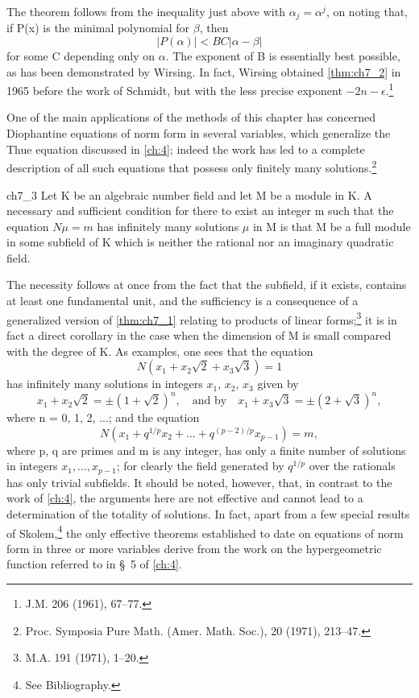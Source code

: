 The theorem follows from the inequality just above with  $\alpha_j = \alpha^j$, on noting that, if P(x) is the minimal polynomial for  $\beta$, then
\[|P(\alpha)| < BC|\alpha - \beta|\]
for some C depending only on  $\alpha$. The exponent of B is essentially best possible, as has been demonstrated by Wirsing. In fact, Wirsing obtained \autoref{thm:ch7_2} in 1965 before the work of Schmidt, but with the less precise exponent  $-2n - \epsilon$.\footnote{J.M. 206 (1961), 67--77.}

One of the main applications of the methods of this chapter has concerned Diophantine equations of norm form in several variables, which generalize the Thue equation discussed in \autoref{ch:4}; indeed the work has led to a complete description of all such equations that possess only finitely many solutions.\footnote{Proc. Symposia Pure Math. (Amer. Math. Soc.), 20 (1971), 213--47.}

\begin{mythm}{}{ch7_3}
Let K be an algebraic number field and let M be a module in K. A necessary and sufficient condition for there to exist an integer m such that the equation  $N\mu = m$  has infinitely many solutions  $\mu$  in M is that M be a full module in some subfield of K which is neither the rational nor an imaginary quadratic field.
\end{mythm}

The necessity follows at once from the fact that the subfield, if it exists, contains at least one fundamental unit, and the sufficiency is a consequence of a generalized version of \autoref{thm:ch7_1} relating to products of linear forms;\footnote{M.A. 191 (1971), 1--20.}  it is in fact a direct corollary in the case when the dimension of M is small compared with the degree of K. As examples, one sees that the equation
\[N(x_1 + x_2\sqrt{2} + x_3\sqrt{3}) = 1\]
has infinitely many solutions in integers  $x_1$, $x_2$, $x_3$  given by
\[x_1 + x_2\sqrt{2} = \pm (1 + \sqrt{2})^n, \quad \text{and by} \quad x_1 + x_3\sqrt{3} = \pm (2 + \sqrt{3})^n,\]
where n = 0, 1, 2, ...; and the equation
\[N(x_1+q^{1/p}x_2+\ldots+q^{(p-2)/p}x_{p-1})=m,\]
where p, q are primes and m is any integer, has only a finite number of solutions in integers  $x_1, ..., x_{p-1}$; for clearly the field generated by  $q^{1/p}$  over the rationals has only trivial subfields. It should be noted, however, that, in contrast to the work of \autoref{ch:4}, the arguments here are not effective and cannot lead to a determination of the totality of solutions. In fact, apart from a few special results of Skolem,\footnote{See Bibliography.} the only effective theorems established to date on equations of norm form in three or more variables derive from the work on the hypergeometric function referred to in \S~5 of \autoref{ch:4}.

